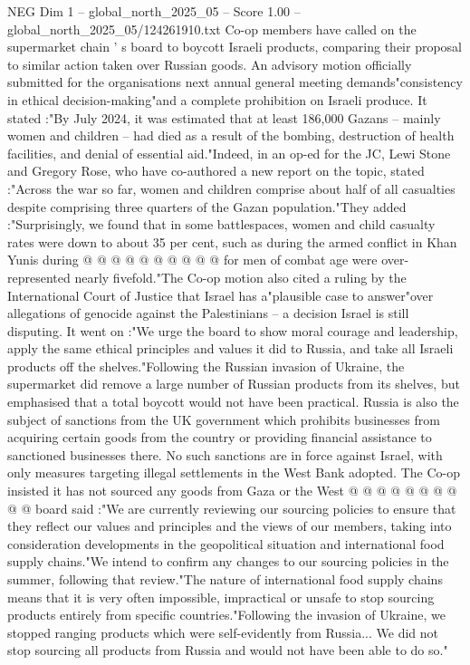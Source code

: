 \begin{textsample}{NEG Dim 1 – global\_north\_2025\_05 – Score 1.00 – global\_north\_2025\_05/124261910.txt}  \label{ex:f1_neg_079}
Co-op members have called on the supermarket chain ' s board to boycott Israeli products, comparing their proposal to similar action taken over Russian goods.
An advisory motion officially submitted for the organisations next annual general meeting demands"consistency in ethical decision-making"and a complete prohibition on Israeli produce.
It stated :"By July 2024, it was estimated that at least 186,000 Gazans -- mainly women and children -- had died as a result of the bombing, destruction of health facilities, and denial of essential aid."Indeed, in an op-ed for the JC, Lewi Stone and Gregory Rose, who have co-authored a new report on the topic, stated :"Across the war so far, women and children comprise about half of all casualties despite comprising three quarters of the Gazan population."They added :"Surprisingly, we found that in some battlespaces, women and child casualty rates were down to about 35 per cent, such as during the armed conflict in Khan Yunis during @ @ @ @ @ @ @ @ @ @ for men of combat age were over-represented nearly fivefold."The Co-op motion also cited a ruling by the International Court of Justice that Israel has a"plausible case to answer"over allegations of genocide against the Palestinians -- a decision Israel is still disputing.
It went on :"We urge the board to show moral courage and leadership, apply the same ethical principles and values it did to Russia, and take all Israeli products off the shelves."Following the Russian invasion of Ukraine, the supermarket did remove a large number of Russian products from its shelves, but emphasised that a total boycott would not have been practical.
Russia is also the subject of sanctions from the UK government which prohibits businesses from acquiring certain goods from the country or providing financial assistance to sanctioned businesses there.
No such sanctions are in force against Israel, with only measures targeting illegal settlements in the West Bank adopted.
The Co-op insisted it has not sourced any goods from Gaza or the West @ @ @ @ @ @ @ @ @ @ board said :"We are currently reviewing our sourcing policies to ensure that they reflect our values and principles and the views of our members, taking into consideration developments in the geopolitical situation and international food supply chains."We intend to confirm any changes to our sourcing policies in the summer, following that review."The nature of international food supply chains means that it is very often impossible, impractical or unsafe to stop sourcing products entirely from specific countries."Following the invasion of Ukraine, we stopped ranging products which were self-evidently from Russia...
We did not stop sourcing all products from Russia and would not have been able to do so."

\end{textsample}
